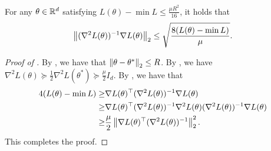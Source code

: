 \begin{lemma}\label{lem:small_loss_imply_no_clipping}
	For any $\theta\in\mathbb{R}^d$ satisfying $L(\theta)-\min L\le \frac{\mu R^2}{16}$, it holds that \begin{align}
 \left\|(\nabla^2 L(\theta))^{-1}\nabla L(\theta)\right\|_2 \le \sqrt{\frac{8(L(\theta) - \min L)}{\mu}}.
 \end{align}

\end{lemma}
\begin{proof}[Proof of ]
	By , we have that $\left\|\theta-\theta^*\right\|_2\le R$. By , we have $\nabla^2 L(\theta)\succeq \frac{1}{2}\nabla^2 L(\theta^*) \succeq \frac{\mu}{2} I_d$. 
	By , we have that 
	\begin{align}
	4(L(\theta) - \min L) \ge &	\nabla L(\theta)^\top (\nabla^2 L(\theta))^{-1}\nabla L(\theta)\\
	\ge &\nabla L(\theta)^\top (\nabla^2 L(\theta))^{-1} \nabla^2 L(\theta)(\nabla^2 L(\theta))^{-1}\nabla L(\theta)\\
	\ge & \frac{\mu}{2}\left\|\nabla L(\theta)^\top (\nabla^2 L(\theta))^{-1}\right\|_2^2.
		\end{align}
This completes the proof.
\end{proof}


